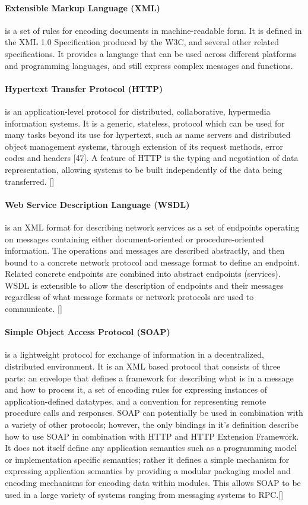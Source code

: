 \paragraph{Extensible Markup Language (XML)}
is a set of rules for encoding documents in machine-readable form. It is defined in the XML 1.0 Specification produced by the W3C, and several other related specifications. It provides a language that can be used across different platforms and programming languages, and still express complex messages and functions.

\paragraph{Hypertext Transfer Protocol (HTTP)} 
is an application-level protocol for distributed, collaborative, hypermedia information systems. It is a generic, stateless, protocol which can be used for many tasks beyond its use for hypertext, such as name servers and distributed object management systems, through extension of its request methods, error codes and headers [47]. A feature of HTTP is the typing and negotiation of data representation, allowing systems to be built independently of the data being transferred. [\citet{HTTP}]

\paragraph{Web Service Description Language (WSDL)}
is an XML format for describing network services as a set of endpoints operating on messages containing either document-oriented or procedure-oriented information. The operations and messages are described abstractly, and then bound to a concrete network protocol and message format to define an endpoint. Related concrete endpoints are combined into abstract endpoints (services). WSDL is extensible to allow the description of endpoints and their messages regardless of what message formats or network protocols are used to communicate. [\citet{WSDL}]

\paragraph{Simple Object Access Protocol (SOAP)}
is a lightweight protocol for exchange of information in a decentralized, distributed environment. It is an XML based protocol that consists of three parts: an envelope that defines a framework for describing what is in a message and how to process it, a set of encoding rules for expressing instances of application-defined datatypes, and a convention for representing remote procedure calls and responses. SOAP can potentially be used in combination with a variety of other protocols; however, the only bindings in it's definition describe how to use SOAP in combination with HTTP and HTTP Extension Framework. It does not itself define any application semantics such as a programming model or implementation specific semantics; rather it defines a simple mechanism for expressing application semantics by providing a modular packaging model and encoding mechanisms for encoding data within modules. This allows SOAP to be used in a large variety of systems ranging from messaging systems to RPC.[\citet{SOAP}]


